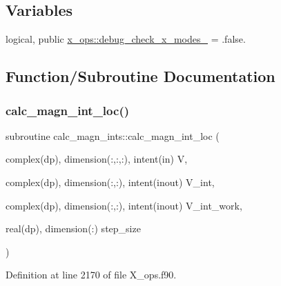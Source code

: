 \subsection*{Variables}
\begin{DoxyCompactItemize}
\item 
logical, public \hyperlink{namespacex__ops_a342c624ea5f9a15264c78767da34684c}{x\+\_\+ops\+::debug\+\_\+check\+\_\+x\+\_\+modes\+\_} = .false.
\end{DoxyCompactItemize}


\subsection{Function/\+Subroutine Documentation}
\mbox{\label{X__ops_8f90_a319069f9962e6d8964d1186afcea89e4}} 
\subsubsection{\texorpdfstring{calc\+\_\+magn\+\_\+int\+\_\+loc()}{calc\_magn\_int\_loc()}}
{\footnotesize\ttfamily subroutine calc\+\_\+magn\+\_\+ints\+::calc\+\_\+magn\+\_\+int\+\_\+loc (\begin{DoxyParamCaption}\item[{complex(dp), dimension(\+:,\+:,\+:), intent(in)}]{V,  }\item[{complex(dp), dimension(\+:,\+:), intent(inout)}]{V\+\_\+int,  }\item[{complex(dp), dimension(\+:,\+:), intent(inout)}]{V\+\_\+int\+\_\+work,  }\item[{real(dp), dimension(\+:)}]{step\+\_\+size }\end{DoxyParamCaption})}



Definition at line 2170 of file X\+\_\+ops.\+f90.

